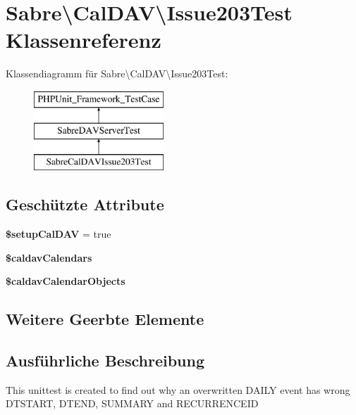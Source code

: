 \hypertarget{class_sabre_1_1_cal_d_a_v_1_1_issue203_test}{}\section{Sabre\textbackslash{}Cal\+D\+AV\textbackslash{}Issue203\+Test Klassenreferenz}
\label{class_sabre_1_1_cal_d_a_v_1_1_issue203_test}
Klassendiagramm für Sabre\textbackslash{}Cal\+D\+AV\textbackslash{}Issue203\+Test\+:\begin{figure}[H]
\begin{center}
\leavevmode
\includegraphics[height=3.000000cm]{class_sabre_1_1_cal_d_a_v_1_1_issue203_test}
\end{center}
\end{figure}
\subsection*{Geschützte Attribute}
\begin{DoxyCompactItemize}
\item 
\mbox{\label{class_sabre_1_1_cal_d_a_v_1_1_issue203_test_a37730430ebda27d413007e1a19728bfd}} 
{\bfseries \$setup\+Cal\+D\+AV} = true
\item 
{\bfseries \$caldav\+Calendars}
\item 
{\bfseries \$caldav\+Calendar\+Objects}
\end{DoxyCompactItemize}
\subsection*{Weitere Geerbte Elemente}


\subsection{Ausführliche Beschreibung}
This unittest is created to find out why an overwritten D\+A\+I\+LY event has wrong D\+T\+S\+T\+A\+RT, D\+T\+E\+ND, S\+U\+M\+M\+A\+RY and R\+E\+C\+U\+R\+R\+E\+N\+C\+E\+ID

